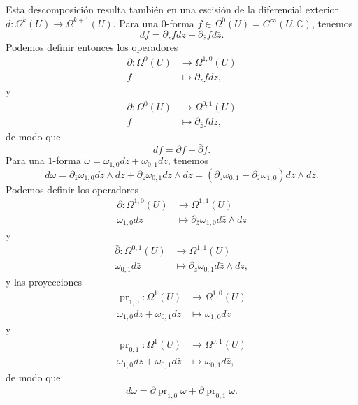 \documentclass[12pt,a4paper]{article}
\theoremstyle{definition} \newtheorem{defn}[thm]{Definición}
\theoremstyle{definition} \newtheorem{ejemplo}[thm]{Ejemplo}
\theoremstyle{definition} \newtheorem{ejercicio}[thm]{Ejercicio}
\def\CC{\mathbb{C}}
\def\delbar{\bar{\partial}}
\DeclareMathOperator{\pr}{pr}
\begin{document}
    Esta descomposición resulta también en una escisión de la diferencial exterior $d:\Omega^k(U) \rightarrow \Omega^{k+1}(U)$. Para una $0$-forma $f\in \Omega^0(U)=C^\infty(U,\CC)$, tenemos
    \begin{equation*}
      df = \partial_ zf  dz + \partial _{\bar{z}} f d\bar{z}.
    \end{equation*}
    Podemos definir entonces los operadores
    \begin{align*}
      \partial :\Omega^0(U)&\longrightarrow \Omega^{1,0}(U)\\ 
        f &\longmapsto \partial_z f dz, 
      \end{align*}
      y
    \begin{align*}
      \delbar :\Omega^0(U)&\longrightarrow \Omega^{0,1}(U)\\ 
      f &\longmapsto \partial_{\bar{z}} f d\bar{z}, 
      \end{align*}
      de modo que
      \begin{equation*}
	df = \partial f + \delbar f.
      \end{equation*}
      Para una $1$-forma $\omega=\omega_{1,0} dz + \omega_{0,1} d\bar{z}$, tenemos
      \begin{equation*}
	d\omega = \partial_{\bar{z}} \omega_{1,0} d\bar{z} \wedge dz + \partial_z \omega_{0,1} dz \wedge d\bar{z} = (\partial_{z} \omega_{0,1}-\partial_{\bar{z}} \omega_{1,0}) dz\wedge d\bar{z}.
      \end{equation*}
      Podemos definir los operadores
      \begin{align*}
	\partial :\Omega^{1,0}(U)&\longrightarrow \Omega^{1,1}(U)\\ 
	\omega_{1,0} dz &\longmapsto \partial_{\bar{z}} \omega_{1,0}d\bar{z} \wedge dz 
	\end{align*}
	y
      \begin{align*}
	\delbar :\Omega^{0,1}(U)&\longrightarrow \Omega^{1,1}(U)\\ 
	\omega_{0,1} d\bar{z} &\longmapsto \partial_{z} \omega_{0,1} d\bar{z} \wedge dz ,
	\end{align*}
	y las proyecciones
	\begin{align*}
	  \pr_{1,0} :\Omega^1(U)&\longrightarrow \Omega^{1,0}(U)\\ 
	  \omega_{1,0}dz + \omega_{0,1} d\bar{z} &\longmapsto \omega_{1,0}dz 
	  \end{align*}
	  y
	\begin{align*}
	  \pr_{0,1} :\Omega^1(U)&\longrightarrow \Omega^{0,1}(U)\\ 
	  \omega_{1,0}dz + \omega_{0,1} d\bar{z} &\longmapsto \omega_{0,1}d\bar{z}, 
	  \end{align*}
	  de modo que
	  \begin{equation*}
	    d\omega = \delbar \pr_{1,0} \omega + \partial \pr_{0,1} \omega.
	  \end{equation*}
\end{document}

